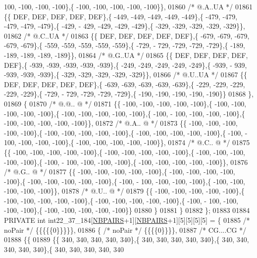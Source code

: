 \begin{DoxyCode}
      100, -100, -100, -100\},\{ -100, -100, -100, -100, -100\}\},
01860 \textcolor{comment}{/*  @.A..UA */}
01861 \{\{  DEF,  DEF,  DEF,  DEF,  DEF\},\{ -449, -449, -449, -449, -449\},\{ -479, -479, -479, -479, -479\},\{ -429, -
      429, -429, -429, -429\},\{ -329, -329, -329, -329, -329\}\},
01862 \textcolor{comment}{/*  @.C..UA */}
01863 \{\{  DEF,  DEF,  DEF,  DEF,  DEF\},\{ -679, -679, -679, -679, -679\},\{ -559, -559, -559, -559, -559\},\{ -729, -
      729, -729, -729, -729\},\{ -189, -189, -189, -189, -189\}\},
01864 \textcolor{comment}{/*  @.G..UA */}
01865 \{\{  DEF,  DEF,  DEF,  DEF,  DEF\},\{ -939, -939, -939, -939, -939\},\{ -249, -249, -249, -249, -249\},\{ -939, -
      939, -939, -939, -939\},\{ -329, -329, -329, -329, -329\}\},
01866 \textcolor{comment}{/*  @.U..UA */}
01867 \{\{  DEF,  DEF,  DEF,  DEF,  DEF\},\{ -639, -639, -639, -639, -639\},\{ -229, -229, -229, -229, -229\},\{ -729, -
      729, -729, -729, -729\},\{ -190, -190, -190, -190, -190\}\}
01868 \},
01869 \{
01870 \textcolor{comment}{/*  @.@.. @ */}
01871 \{\{ -100, -100, -100, -100, -100\},\{ -100, -100, -100, -100, -100\},\{ -100, -100, -100, -100, -100\},\{ -100, -
      100, -100, -100, -100\},\{ -100, -100, -100, -100, -100\}\},
01872 \textcolor{comment}{/*  @.A.. @ */}
01873 \{\{ -100, -100, -100, -100, -100\},\{ -100, -100, -100, -100, -100\},\{ -100, -100, -100, -100, -100\},\{ -100, -
      100, -100, -100, -100\},\{ -100, -100, -100, -100, -100\}\},
01874 \textcolor{comment}{/*  @.C.. @ */}
01875 \{\{ -100, -100, -100, -100, -100\},\{ -100, -100, -100, -100, -100\},\{ -100, -100, -100, -100, -100\},\{ -100, -
      100, -100, -100, -100\},\{ -100, -100, -100, -100, -100\}\},
01876 \textcolor{comment}{/*  @.G.. @ */}
01877 \{\{ -100, -100, -100, -100, -100\},\{ -100, -100, -100, -100, -100\},\{ -100, -100, -100, -100, -100\},\{ -100, -
      100, -100, -100, -100\},\{ -100, -100, -100, -100, -100\}\},
01878 \textcolor{comment}{/*  @.U.. @ */}
01879 \{\{ -100, -100, -100, -100, -100\},\{ -100, -100, -100, -100, -100\},\{ -100, -100, -100, -100, -100\},\{ -100, -
      100, -100, -100, -100\},\{ -100, -100, -100, -100, -100\}\}
01880 \}
01881 \}
01882 \};
01883 
01884 PRIVATE \textcolor{keywordtype}{int} int22\_37\_184[\hyperlink{energy__const_8h_a5e75221c779d618eab81e096f37e32ce}{NBPAIRS}+1][\hyperlink{energy__const_8h_a5e75221c779d618eab81e096f37e32ce}{NBPAIRS}+1][5][5][5][5] = \{
01885 \textcolor{comment}{/* noPair */} \{\{\{\{\{0\}\}\}\}\},
01886 \{ \textcolor{comment}{/* noPair */} \{\{\{\{0\}\}\}\},
01887 \textcolor{comment}{/* CG....CG */}
01888 \{\{
01889 \{\{ 340, 340, 340, 340, 340\},\{ 340, 340, 340, 340, 340\},\{ 340, 340, 340, 340, 340\},\{ 340, 340, 340, 340, 340

\end{DoxyCode}
